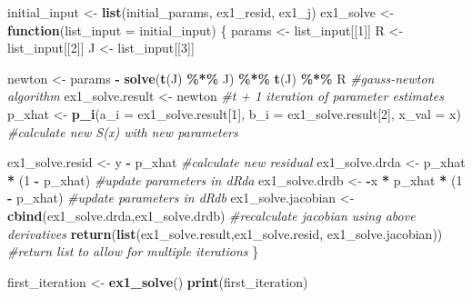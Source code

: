 \documentclass[
]{article}
\newenvironment{Shaded}{\begin{snugshade}}{\end{snugshade}}
\newcommand{\CommentTok}[1]{\textcolor[rgb]{0.56,0.35,0.01}{\textit{#1}}}
\newcommand{\ControlFlowTok}[1]{\textcolor[rgb]{0.13,0.29,0.53}{\textbf{#1}}}
\newcommand{\DataTypeTok}[1]{\textcolor[rgb]{0.13,0.29,0.53}{#1}}
\newcommand{\DecValTok}[1]{\textcolor[rgb]{0.00,0.00,0.81}{#1}}
\newcommand{\KeywordTok}[1]{\textcolor[rgb]{0.13,0.29,0.53}{\textbf{#1}}}
\newcommand{\NormalTok}[1]{#1}
\newcommand{\OperatorTok}[1]{\textcolor[rgb]{0.81,0.36,0.00}{\textbf{#1}}}
\newcommand{\StringTok}[1]{\textcolor[rgb]{0.31,0.60,0.02}{#1}}
\begin{document}
\begin{Shaded}
\begin{Highlighting}[]
\NormalTok{initial\_input \textless{}{-}}\StringTok{ }\KeywordTok{list}\NormalTok{(initial\_params, ex1\_resid, ex1\_j)}
\NormalTok{ex1\_solve \textless{}{-}}\StringTok{ }\ControlFlowTok{function}\NormalTok{(}\DataTypeTok{list\_input =}\NormalTok{ initial\_input) \{}
\NormalTok{  params \textless{}{-}}\StringTok{ }\NormalTok{list\_input[[}\DecValTok{1}\NormalTok{]]}
\NormalTok{  R \textless{}{-}}\StringTok{ }\NormalTok{list\_input[[}\DecValTok{2}\NormalTok{]]}
\NormalTok{  J \textless{}{-}}\StringTok{ }\NormalTok{list\_input[[}\DecValTok{3}\NormalTok{]]}

  
\NormalTok{  newton \textless{}{-}}\StringTok{ }\NormalTok{params }\OperatorTok{{-}}\StringTok{ }\KeywordTok{solve}\NormalTok{(}\KeywordTok{t}\NormalTok{(J) }\OperatorTok{\%*\%}\StringTok{ }\NormalTok{J) }\OperatorTok{\%*\%}\StringTok{ }\KeywordTok{t}\NormalTok{(J) }\OperatorTok{\%*\%}\StringTok{ }\NormalTok{R }\CommentTok{\#gauss{-}newton algorithm}
\NormalTok{  ex1\_solve.result \textless{}{-}}\StringTok{ }\NormalTok{newton }\CommentTok{\#t + 1 iteration of parameter estimates}
\NormalTok{  p\_xhat \textless{}{-}}\StringTok{ }\KeywordTok{p\_i}\NormalTok{(}\DataTypeTok{a\_i =}\NormalTok{ ex1\_solve.result[}\DecValTok{1}\NormalTok{], }\DataTypeTok{b\_i =}\NormalTok{ ex1\_solve.result[}\DecValTok{2}\NormalTok{], }\DataTypeTok{x\_val =}\NormalTok{ x) }\CommentTok{\#calculate new S(x) with new parameters}
  
\NormalTok{  ex1\_solve.resid \textless{}{-}}\StringTok{ }\NormalTok{y }\OperatorTok{{-}}\StringTok{ }\NormalTok{p\_xhat }\CommentTok{\#calculate new residual}
\NormalTok{  ex1\_solve.drda \textless{}{-}}\StringTok{  }\NormalTok{p\_xhat }\OperatorTok{*}\StringTok{ }\NormalTok{(}\DecValTok{1} \OperatorTok{{-}}\StringTok{ }\NormalTok{p\_xhat) }\CommentTok{\#update parameters in dRda}
\NormalTok{  ex1\_solve.drdb \textless{}{-}}\StringTok{ }\OperatorTok{{-}}\NormalTok{x }\OperatorTok{*}\StringTok{ }\NormalTok{p\_xhat }\OperatorTok{*}\StringTok{ }\NormalTok{(}\DecValTok{1} \OperatorTok{{-}}\StringTok{ }\NormalTok{p\_xhat) }\CommentTok{\#update parameters in dRdb }
\NormalTok{  ex1\_solve.jacobian \textless{}{-}}\StringTok{ }\KeywordTok{cbind}\NormalTok{(ex1\_solve.drda,ex1\_solve.drdb) }\CommentTok{\#recalculate jacobian using above derivatives}
    \KeywordTok{return}\NormalTok{(}\KeywordTok{list}\NormalTok{(ex1\_solve.result,ex1\_solve.resid, ex1\_solve.jacobian)) }\CommentTok{\#return list to allow for multiple iterations}
\NormalTok{\}}


\NormalTok{first\_iteration \textless{}{-}}\StringTok{ }\KeywordTok{ex1\_solve}\NormalTok{()}
\KeywordTok{print}\NormalTok{(first\_iteration)}
\end{Highlighting}
\end{Shaded}
\end{document}
